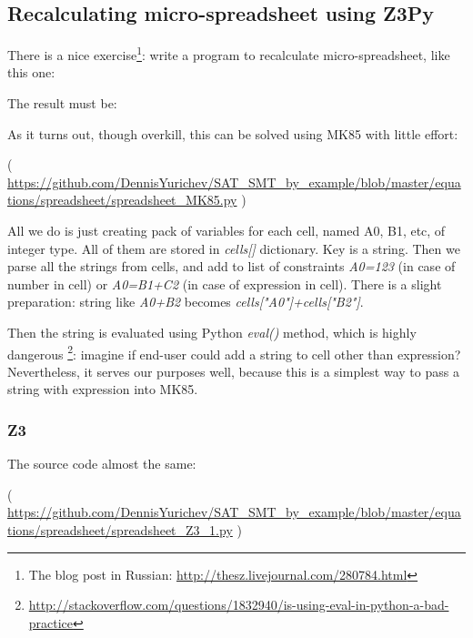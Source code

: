 \subsection{Recalculating micro-spreadsheet using Z3Py}

\renewcommand{\CURPATH}{equations/spreadsheet}

There is a nice exercise\footnote{The blog post in Russian: \url{http://thesz.livejournal.com/280784.html}}:
write a program to recalculate micro-spreadsheet, like this one:



The result must be:



As it turns out, though overkill, this can be solved using MK85 with little effort:



( \url{https://github.com/DennisYurichev/SAT_SMT_by_example/blob/master/equations/spreadsheet/spreadsheet_MK85.py} )

All we do is just creating pack of variables for each cell, named A0, B1, etc, of integer type.
All of them are stored in \textit{cells[]} dictionary.
Key is a string.
Then we parse all the strings from cells, and add to list of constraints \textit{A0=123}
(in case of number in cell) or \textit{A0=B1+C2} (in case of expression in cell).
There is a slight preparation: string like \textit{A0+B2} becomes \textit{cells["A0"]+cells["B2"]}.

Then the string is evaluated using Python \textit{eval()} method,
which is highly dangerous
\footnote{\url{http://stackoverflow.com/questions/1832940/is-using-eval-in-python-a-bad-practice}}:
imagine if end-user could add a string to cell other than expression?
Nevertheless, it serves our purposes well, because this is a simplest way to pass a string with expression into MK85.

\subsubsection{Z3}

The source code almost the same:



( \url{https://github.com/DennisYurichev/SAT_SMT_by_example/blob/master/equations/spreadsheet/spreadsheet_Z3_1.py} )


